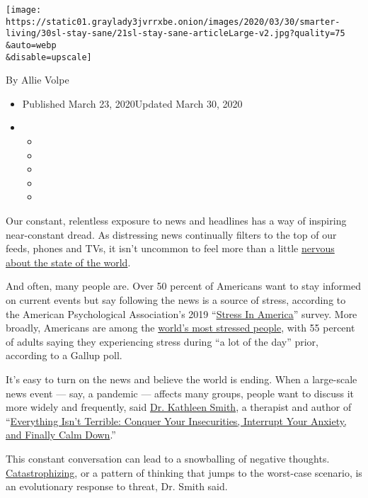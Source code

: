 \texttt{[image: https://static01.graylady3jvrrxbe.onion/images/2020/03/30/smarter-living/30sl-stay-sane/21sl-stay-sane-articleLarge-v2.jpg?quality=75\\\&auto=webp\\\&disable=upscale]}

By Allie Volpe

\begin{itemize}
\item
  Published March 23, 2020Updated March 30, 2020
\item
  \begin{itemize}
  \item
  \item
  \item
  \item
  \item
  \end{itemize}
\end{itemize}

Our constant, relentless exposure to news and headlines has a way of
inspiring near-constant dread. As distressing news continually filters
to the top of our feeds, phones and TVs, it isn't uncommon to feel more
than a little
\href{https://www.nbcnews.com/better/health/what-headline-stress-disorder-do-you-have-it-ncna830141}{nervous
about the state of the world}.

And often, many people are. Over 50 percent of Americans want to stay
informed on current events but say following the news is a source of
stress, according to the American Psychological Association's 2019
``\href{https://www.apa.org/news/press/releases/stress/2019/stress-america-2019.pdf}{Stress
In America}'' survey. More broadly, Americans are among the
\href{https://www.nytimes3xbfgragh.onion/2019/04/25/us/americans-stressful.html}{world's
most stressed people}, with 55 percent of adults saying they
experiencing stress during ``a lot of the day'' prior, according to a
Gallup poll.

It's easy to turn on the news and believe the world is ending. When a
large-scale news event --- say, a pandemic --- affects many groups,
people want to discuss it more widely and frequently, said
\href{https://kathleensmith.net/}{Dr. Kathleen Smith}, a therapist and
author of
``\href{https://www.hachettebooks.com/titles/kathleen-smith/everything-isnt-terrible/9780316492553/}{Everything
Isn't Terrible: Conquer Your Insecurities, Interrupt Your Anxiety, and
Finally Calm Down}.''

This constant conversation can lead to a snowballing of negative
thoughts.
\href{https://www.medicalnewstoday.com/articles/320844}{Catastrophizing},
or a pattern of thinking that jumps to the worst-case scenario, is an
evolutionary response to threat, Dr. Smith said.

